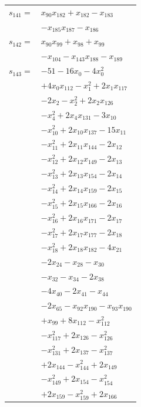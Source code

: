 \begin{longtable}{@{}r@{\;}l@{}}
\(s_{141}=\) & \(\displaystyle x_{90}x_{182} +x_{182} -x_{183}\) \\
 & \(\displaystyle -x_{185}x_{187} -x_{186}\) \\[3pt]
\(s_{142}=\) & \(\displaystyle x_{90}x_{99} +x_{98} +x_{99}\) \\
 & \(\displaystyle -x_{104} -x_{143}x_{188} -x_{189}\) \\[3pt]
\(s_{143}=\) & \(\displaystyle -51 -16x_{0} -4x_{0}^{2}\) \\
 & \(\displaystyle +4x_{0}x_{112} -x_{1}^{2} +2x_{1}x_{117}\) \\
 & \(\displaystyle -2x_{2} -x_{2}^{2} +2x_{2}x_{126}\) \\
 & \(\displaystyle -x_{4}^{2} +2x_{4}x_{131} -3x_{10}\) \\
 & \(\displaystyle -x_{10}^{2} +2x_{10}x_{137} -15x_{11}\) \\
 & \(\displaystyle -x_{11}^{2} +2x_{11}x_{144} -2x_{12}\) \\
 & \(\displaystyle -x_{12}^{2} +2x_{12}x_{149} -2x_{13}\) \\
 & \(\displaystyle -x_{13}^{2} +2x_{13}x_{154} -2x_{14}\) \\
 & \(\displaystyle -x_{14}^{2} +2x_{14}x_{159} -2x_{15}\) \\
 & \(\displaystyle -x_{15}^{2} +2x_{15}x_{166} -2x_{16}\) \\
 & \(\displaystyle -x_{16}^{2} +2x_{16}x_{171} -2x_{17}\) \\
 & \(\displaystyle -x_{17}^{2} +2x_{17}x_{177} -2x_{18}\) \\
 & \(\displaystyle -x_{18}^{2} +2x_{18}x_{182} -4x_{21}\) \\
 & \(\displaystyle -2x_{24} -x_{28} -x_{30}\) \\
 & \(\displaystyle -x_{32} -x_{34} -2x_{38}\) \\
 & \(\displaystyle -4x_{40} -2x_{41} -x_{44}\) \\
 & \(\displaystyle -2x_{65} -x_{92}x_{190} -x_{93}x_{190}\) \\
 & \(\displaystyle +x_{99} +8x_{112} -x_{112}^{2}\) \\
 & \(\displaystyle -x_{117}^{2} +2x_{126} -x_{126}^{2}\) \\
 & \(\displaystyle -x_{131}^{2} +2x_{137} -x_{137}^{2}\) \\
 & \(\displaystyle +2x_{144} -x_{144}^{2} +2x_{149}\) \\
 & \(\displaystyle -x_{149}^{2} +2x_{154} -x_{154}^{2}\) \\
 & \(\displaystyle +2x_{159} -x_{159}^{2} +2x_{166}\) \\

\end{longtable}
